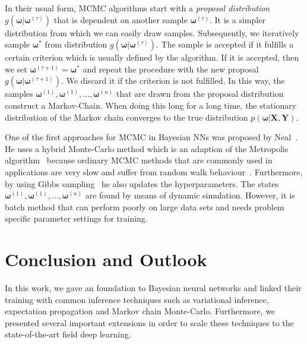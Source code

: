 \documentclass[runningheads]{llncs}
\begin{document}
In their usual form, MCMC algorithms start with a \textit{proposal distribution} $g(\boldsymbol{\omega} | \boldsymbol{\omega}^{(\tau)})$ that is dependent on another sample $\boldsymbol{\omega}^{(\tau)}$.
It is a simpler distribution from which we can easily draw samples.
Subsequently, we iteratively sample $\boldsymbol{\omega}^*$ from distribution $g(\boldsymbol{\omega} | \boldsymbol{\omega}^{(\tau)})$.
The sample is accepted if it fulfills a certain criterion which is usually defined by the algorithm.
If it is accepted, then we set $\boldsymbol{\omega}^{(\tau + 1)} = \boldsymbol{\omega}^*$ and repeat the procedure with the new proposal $g(\boldsymbol{\omega} | \boldsymbol{\omega}^{(\tau + 1)})$.
We discard it if the criterion is not fulfilled.
In this way, the samples $\boldsymbol{\omega}^{(1)}, \boldsymbol{\omega}^{(1)}, \ldots, \boldsymbol{\omega}^{(n)}$ that are drawn from the proposal distribution construct a Markov-Chain.
When doing this long for a long time, the stationary distribution of the Markov chain converges to the true distribution $p(\boldsymbol{\omega} | \mathbf{X}, \mathbf{Y})$.

One of the first approaches for MCMC in Bayesian NNs was proposed by Neal~\cite{Neal:1995:BLN:922680}. 
He uses a hybrid Monte-Carlo method which is an adaption of the Metropolis algorithm~\cite{metropolis1953equation} because ordinary MCMC methods that are commonly used in applications are very slow and suffer from random walk behaviour~\cite{bishop:2006:PRML}.
Furthermore, by using Gibbs sampling~\cite{Geman:1984:SRG:2286442.2286617} he also updates the hyperparameters.
The states $\boldsymbol{\omega}^{(1)}, \boldsymbol{\omega}^{(1)}, \ldots, \boldsymbol{\omega}^{(n)}$ are found by means of dynamic simulation.
However, it is batch method that can perform poorly on large data sets and needs problem specific parameter settings for training.

\section{Conclusion and Outlook}
\label{sec:conclusion_outlook}
In this work, we gave an foundation to Bayesian neural networks and linked their training with common inference techniques such as variational inference, expectation propagation and Markov chain Monte-Carlo.
Furthermore, we presented several important extensions in order to scale these techniques to the state-of-the-art field deep learning.
\end{document}
